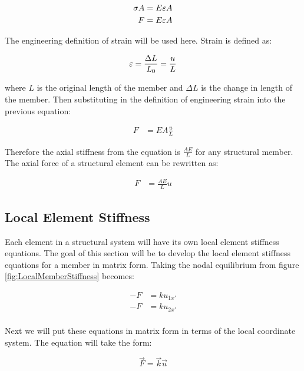 \begin{align}
	\sigma A &= E \varepsilon A\\
	F & = E \varepsilon A
\end{align}

The engineering definition of strain will be used here. Strain is defined as:

\begin{equation}
	\varepsilon = \frac{\Delta L}{L_0} = \frac{u}{L}
\end{equation}

where $L$ is the original length of the member and $\Delta L$ is the change in length of the member. Then substituting in the definition of engineering strain into the previous equation:

\begin{align}
	F & = EA \frac{u}{L}
\end{align}

Therefore the axial stiffness from the equation is $\frac{AE}{L}$ for any structural member. The axial force of a structural element can be rewritten as:

\begin{align}
	F & = \frac{AE}{L} u
\end{align}

\subsection{Local Element Stiffness}
Each element in a structural system will have its own local element stiffness equations. The goal of this section will be to develop the local element stiffness equations for a member in matrix form. Taking the nodal equilibrium from figure \ref{fig:LocalMemberStiffness} becomes:

\begin{align*}
	-F &= ku_{1x'}\\
	-F &= ku_{2x'}\\
\end{align*}

Next we will put these equations in matrix form in terms of the local coordinate system. The equation will take the form:

\begin{equation}
	\vec{F} = \vec{k} \vec{u}
\end{equation}

